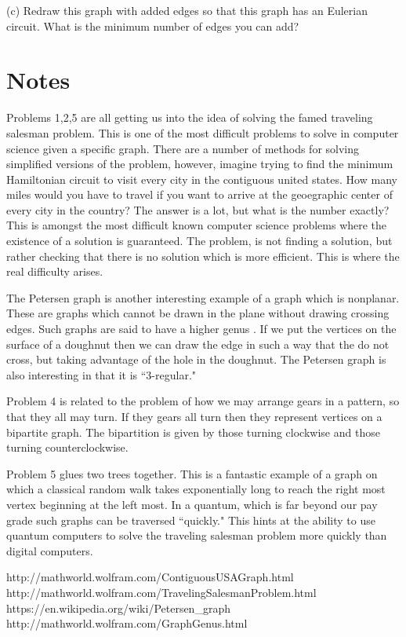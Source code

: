 \documentclass[16 pt]{amsart}
\theoremstyle{definition}
\theoremstyle{remark}
\numberwithin{equation}{subsection}
\begin{document}
(c) Redraw this graph with added edges so that this graph has an Eulerian circuit.  What is the minimum number of edges you can add?




\newpage

\section{Notes}

Problems 1,2,5 are all getting us into the idea of solving the famed traveling salesman problem\cite{TSP}.  This is one of the most difficult problems to solve in computer science given a specific graph.  There are a number of methods for solving simplified versions of the problem, however, imagine trying to find the minimum Hamiltonian circuit to visit every city in the contiguous united states.  How many miles would you have to travel if you want to arrive at the geoegraphic center of every city in the country?  The answer is a lot, but what is the number exactly?  This is amongst the most difficult known computer science problems where the existence of a solution is guaranteed.  The problem, is not finding a solution, but rather checking that there is no solution which is more efficient.  This is where the real difficulty arises.

The Petersen graph\cite{Pet} is another interesting example of a graph which is nonplanar.  These are graphs which cannot be drawn in the plane without drawing crossing edges.  Such graphs are said to have a higher genus \cite{Gen}.  If we put the vertices on the surface of a doughnut then we can draw the edge in such a way that the do not cross, but taking advantage of the hole in the doughnut.  The Petersen graph is also interesting in that it is ``3-regular." 

Problem 4 is related to the problem of how we may arrange gears in a pattern, so that they all may turn.  If they gears all turn then they represent vertices on a bipartite graph.  The bipartition is given by those turning clockwise and those turning counterclockwise.

Problem 5 glues two trees together.  This is a fantastic example of a graph on which a classical random walk takes exponentially long to reach the right most vertex beginning at the left most.  In a quantum, which is far beyond our pay grade such graphs can be traversed ``quickly."  This hints at the ability to use quantum computers to solve the traveling salesman problem more quickly than digital computers.

\begin{thebibliography}{99}
http://mathworld.wolfram.com/ContiguousUSAGraph.html\\
http://mathworld.wolfram.com/TravelingSalesmanProblem.html\\
 https://en.wikipedia.org/wiki/Petersen\_graph\\
http://mathworld.wolfram.com/GraphGenus.html


\end{thebibliography}
\end{document}
